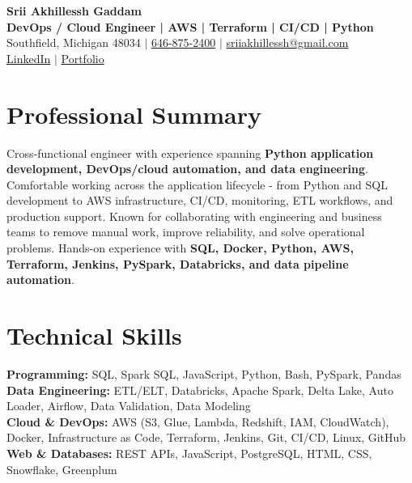 \documentclass[letterpaper,10pt]{article}
\begin{document}
\fontsize{9.35pt}{10.45pt}\selectfont

\begin{center}
    {\LARGE \textbf{Srii Akhillessh Gaddam}} \\[-1pt]
    \textbf{DevOps / Cloud Engineer | AWS | Terraform | CI/CD | Python} \\[2pt]
    Southfield, Michigan 48034 $|$
    \href{tel:6468752400}{646-875-2400} $|$
    \href{mailto:sriiakhillessh@gmail.com}{sriiakhillessh@gmail.com} \\[1pt]
    \href{https://www.linkedin.com/in/srii-akhiilessh-gaddam-b48668191/}{LinkedIn} $|$
    \href{https://sriiakhillesshg.github.io/portfolio/}{Portfolio}
\end{center}
\vspace{-8pt}

\section{Professional Summary}
\small{Cross-functional engineer with experience spanning \textbf{Python application development, DevOps/cloud automation, and data engineering}. Comfortable working across the application lifecycle - from Python and SQL development to AWS infrastructure, CI/CD, monitoring, ETL workflows, and production support. Known for collaborating with engineering and business teams to remove manual work, improve reliability, and solve operational problems. Hands-on experience with \textbf{SQL, Docker, Python, AWS, Terraform, Jenkins, PySpark, Databricks, and data pipeline automation}.}

\section{Technical Skills}
\small{
\textbf{Programming:} SQL, Spark SQL, JavaScript, Python, Bash, PySpark, Pandas \\
\textbf{Data Engineering:} ETL/ELT, Databricks, Apache Spark, Delta Lake, Auto Loader, Airflow, Data Validation, Data Modeling \\
\textbf{Cloud \& DevOps:} AWS (S3, Glue, Lambda, Redshift, IAM, CloudWatch), Docker, Infrastructure as Code, Terraform, Jenkins, Git, CI/CD, Linux, GitHub \\
\textbf{Web \& Databases:} REST APIs, JavaScript, PostgreSQL, HTML, CSS, Snowflake, Greenplum
}
\end{document}
